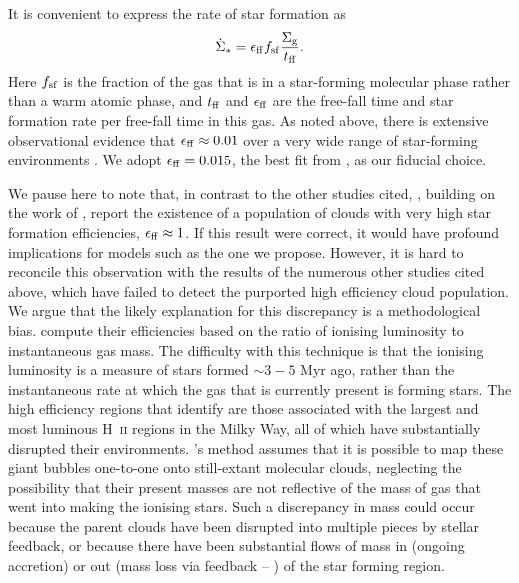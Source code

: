 \documentclass[useAMS,usenatbib]{mn2e}
\begin{document}
It is convenient to express the rate of star formation as
\begin{equation}
\label{eq:sfr}
\dot{\Sigma}_* = \epsilon_{\rm ff} f_{\rm sf} \frac{\Sigma_{\rm g}}{t_{\rm ff}}.
\end{equation}
Here $f_{\rm sf}$ is the fraction of the gas that is in a star-forming molecular phase rather than a warm atomic phase, and $t_{\rm ff}$ and $\epsilon_{\rm ff}$ are the free-fall time and star formation rate per free-fall time in this gas. As noted above, there is extensive observational evidence that $\epsilon_{\rm ff} \approx 0.01$ over a very wide range of star-forming environments \citep{krumholz07e, krumholz12a, garcia-burillo12a, evans14a, salim15a, usero15a, heyer16a, vutisalchavakul16a, leroy17a, onus18a}. We adopt $\epsilon_{\rm ff} = 0.015$, the best fit from \citet{krumholz12a}, as our fiducial choice.

We pause here to note that, in contrast to the other studies cited, \citet{lee16a}, building on the work of \citet{murray11b}, report the existence of a population of clouds with very high star formation efficiencies, $\epsilon_{\rm ff} \approx 1$. If this result were correct, it would have profound implications for models such as the one we propose. However, it is hard to reconcile this observation with the results of the numerous other studies cited above, which have failed to detect the purported high efficiency cloud population. We argue that the likely explanation for this discrepancy is a methodological bias. \citet{lee16a} compute their efficiencies based on the ratio of ionising luminosity to instantaneous gas mass. The difficulty with this technique is that the ionising luminosity is a measure of stars formed $\sim 3-5$ Myr ago, rather than the instantaneous rate at which the gas that is currently present is forming stars. The high efficiency regions that \citet{lee16a} identify are those associated with the largest and most luminous H~\textsc{ii} regions in the Milky Way, all of which have substantially disrupted their environments. \citeauthor{lee16a}'s method assumes that it is possible to map these giant bubbles one-to-one onto still-extant molecular clouds, neglecting the possibility that their present masses are not reflective of the mass of gas that went into making the ionising stars. Such a discrepancy in mass could occur because the parent clouds have been disrupted into multiple pieces by stellar feedback, or because there have been substantial flows of mass in (ongoing accretion) or out (mass loss via feedback -- \citealt{feldmann11a}) of the star forming region.
\end{document}
